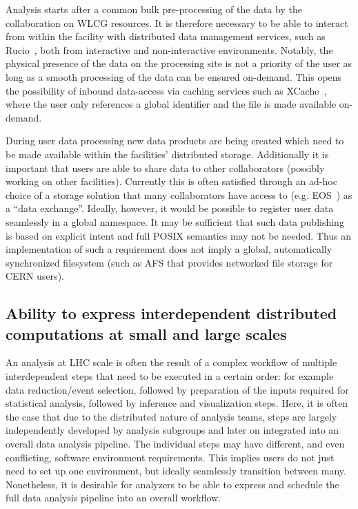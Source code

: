 Analysis starts after a common bulk pre-processing of the data by the collaboration on WLCG resources. It is therefore necessary to be able to interact from within the facility with distributed data management services, such as Rucio~\cite{rucio}, both from interactive and non-interactive environments. Notably, the physical presence of the data on the processing site is not a priority of the user as long as a smooth processing of the data can be ensured on-demand. This opens the possibility of inbound data-access via caching services such as XCache~\cite{xcache}, where the user only references a global identifier and the file is made available on-demand.

During user data processing new data products are being created which need to be made available within the facilities’ distributed storage. Additionally it is important that users are able to share data to other collaborators (possibly working on other facilities). Currently this is often satisfied through an ad-hoc choice of a storage solution that many collaborators have access to (e.g. EOS~\cite{eos}) as a “data exchange”. Ideally, however, it would be possible to register user data seamlessly in a global namespace. It may be sufficient that such data publishing is based on explicit intent and full POSIX semantics may not be needed. Thus an implementation of such a requirement does not imply a global, automatically synchronized filesystem (such as AFS that provides networked file storage for CERN users).
 
\subsection*{Ability to express interdependent distributed computations at small and large scales}

An analysis at LHC scale is often the result of a complex workflow of multiple interdependent steps that need to be executed in a certain order: for example data reduction/event selection, followed by preparation of the inputs required for statistical analysis, followed by inference and visualization steps. Here, it is often the case that due to the distributed nature of analysis teams, steps are largely independently developed by analysis subgroups and later on integrated into an overall data analysis pipeline. The individual steps may have different, and even conflicting, software environment requirements. This implies users do not just need to set up one environment, but ideally seamlessly transition between many. Nonetheless, it is desirable for analyzers to be able to express and schedule the full data analysis pipeline into an overall workflow. 

